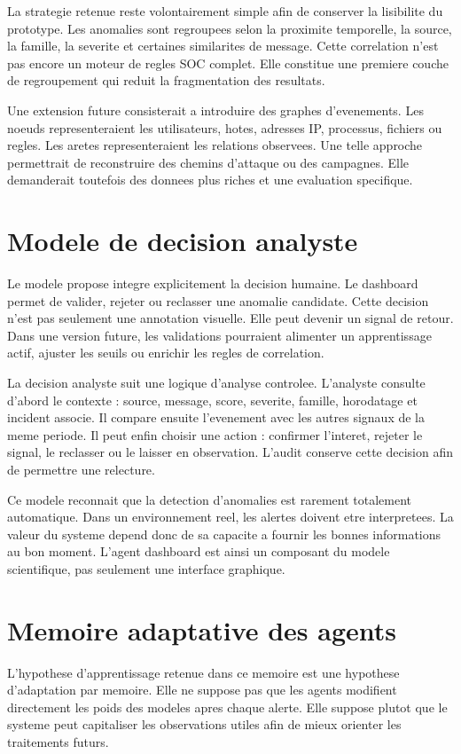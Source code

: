 La strategie retenue reste volontairement simple afin de conserver la lisibilite du prototype. Les anomalies sont regroupees selon la proximite temporelle, la source, la famille, la severite et certaines similarites de message. Cette correlation n'est pas encore un moteur de regles SOC complet. Elle constitue une premiere couche de regroupement qui reduit la fragmentation des resultats.

Une extension future consisterait a introduire des graphes d'evenements. Les noeuds representeraient les utilisateurs, hotes, adresses IP, processus, fichiers ou regles. Les aretes representeraient les relations observees. Une telle approche permettrait de reconstruire des chemins d'attaque ou des campagnes. Elle demanderait toutefois des donnees plus riches et une evaluation specifique.

\section{Modele de decision analyste}
Le modele propose integre explicitement la decision humaine. Le dashboard permet de valider, rejeter ou reclasser une anomalie candidate. Cette decision n'est pas seulement une annotation visuelle. Elle peut devenir un signal de retour. Dans une version future, les validations pourraient alimenter un apprentissage actif, ajuster les seuils ou enrichir les regles de correlation.

La decision analyste suit une logique d'analyse controlee. L'analyste consulte d'abord le contexte : source, message, score, severite, famille, horodatage et incident associe. Il compare ensuite l'evenement avec les autres signaux de la meme periode. Il peut enfin choisir une action : confirmer l'interet, rejeter le signal, le reclasser ou le laisser en observation. L'audit conserve cette decision afin de permettre une relecture.

Ce modele reconnait que la detection d'anomalies est rarement totalement automatique. Dans un environnement reel, les alertes doivent etre interpretees. La valeur du systeme depend donc de sa capacite a fournir les bonnes informations au bon moment. L'agent dashboard est ainsi un composant du modele scientifique, pas seulement une interface graphique.

\section{Memoire adaptative des agents}
L'hypothese d'apprentissage retenue dans ce memoire est une hypothese d'adaptation par memoire. Elle ne suppose pas que les agents modifient directement les poids des modeles apres chaque alerte. Elle suppose plutot que le systeme peut capitaliser les observations utiles afin de mieux orienter les traitements futurs.

